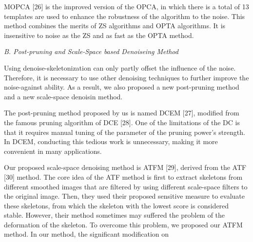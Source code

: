 \documentclass{article}
\begin{document}
\begin{newpage}
\begin{multicols}{2}
\begin{minipage}[t]{0.47\textwidth}
\end {minipage}

\raggedleft
\begin{minipage}[t]{0.48\textwidth}

MOPCA [26] is the improved version of the OPCA, in which there is a total of 13 templates are used to enhance the robustness of the algorithm to the noise. This method combines the merits of ZS algorithms and OPTA algorithms. It is insensitive to noise as the ZS and as fast as the OPTA method. 

\vspace{0.4cm} \textit{B. Post-pruning and Scale-Space based Denoiseing Method}

\vspace{0.2cm} \hspace{0.2cm}Using denoise-skeletonization can only partly offset the influence of the noise. Therefore, it is necessary to use other denoising techniques to further improve the noise-against ability. As a result, we also proposed a new post-pruning method and a new scale-space denoisin method. 

\hspace{0.2cm}The post-pruning method proposed by us is named DCEM [27], modified from the famous pruning algorithm of DCE [28]. One of the limitations of the DC is that it requires manual tuning of the parameter of the pruning power’s strength. In DCEM, conducting this tedious work is unnecessary, making it more convenient in many applications. 

\hspace{0.2cm}Our proposed scale-space denoising method is ATFM [29], derived from the ATF [30] method. The core idea of the ATF method is first to extract skeletons from different smoothed images that are filtered by using different scale-space filters to the original image. Then, they used their proposed sensitive measure to evaluate these skeletons, from which the skeleton with the lowest score is considered stable. However, their method sometimes may suffered the problem of the deformation of the skeleton. To overcome this problem, we proposed our ATFM method. In our method, the significant modification on

\end{minipage}

\end{multicols}
    
\end{newpage}
\end{document}
